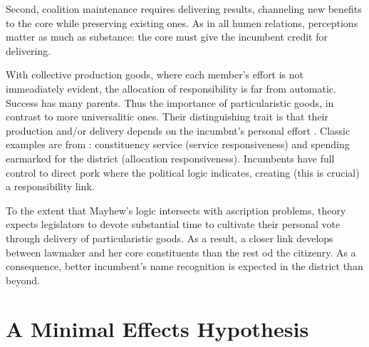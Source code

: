 \documentclass[letter,12pt]{article}
\begin{document}
Second, coalition maintenance requires delivering results, channeling new benefits to the core while preserving existing ones. As in all humen relations, perceptions matter as much as substance: the core must give the incumbent credit for delivering. 

With collective production goods, where each member's effort is not immeadiately evident, the allocation of responsibility is far from automatic. Success has many parents. Thus the importance of particularistic goods, in contrast to more universalitic ones. Their distinguishing trait is that their production and/or delivery depends on the incumbnt's personal effort \citep{haggard.mccubbins.2001}. Classic examples are from \citet{cain.etal.1987}: constituency service (service responsiveness) and spending earmarked for the district (allocation responsiveness). Incumbents have full control to direct pork where the political logic indicates, creating (this is crucial) a responsibility link.

To the extent that Mayhew's logic intersects with ascription problems, theory expects legislators to devote substantial time to cultivate their personal vote through delivery of particularistic goods. As a result, a closer link develops between lawmaker and her core constituents than the rest od the citizenry. As a consequence, better incumbent's name recognition is expected in the district than beyond. 




\section{A Minimal Effects Hypothesis}
\end{document}
